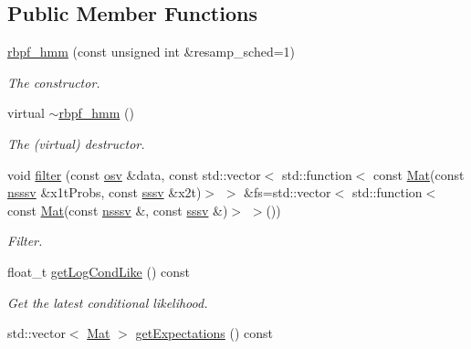 \subsection*{Public Member Functions}
\begin{DoxyCompactItemize}
\item 
\hyperlink{classrbpf__hmm_a39295fbe6066714572219c4544ba2940}{rbpf\+\_\+hmm} (const unsigned int \&resamp\+\_\+sched=1)
\begin{DoxyCompactList}\small\item\em The constructor. \end{DoxyCompactList}\item 
\mbox{\label{classrbpf__hmm_a9f463acdb7798d3bc86bc7d5abb31263}} 
virtual \hyperlink{classrbpf__hmm_a9f463acdb7798d3bc86bc7d5abb31263}{$\sim$rbpf\+\_\+hmm} ()
\begin{DoxyCompactList}\small\item\em The (virtual) destructor. \end{DoxyCompactList}\item 
void \hyperlink{classrbpf__hmm_a74864b32274b746d281295c293a28cdd}{filter} (const \hyperlink{classrbpf__hmm_adafd37687fdd3bb776d3d33a5b0e7080}{osv} \&data, const std\+::vector$<$ std\+::function$<$ const \hyperlink{classrbpf__hmm_ac32aaf9833767d6886f732243a77aa66}{Mat}(const \hyperlink{classrbpf__hmm_a7988465662f94f2ba45fd22566828d0f}{nsssv} \&x1t\+Probs, const \hyperlink{classrbpf__hmm_a28e8ad1d93bcf53cb74603f74826a81c}{sssv} \&x2t)$>$ $>$ \&fs=std\+::vector$<$ std\+::function$<$ const \hyperlink{classrbpf__hmm_ac32aaf9833767d6886f732243a77aa66}{Mat}(const \hyperlink{classrbpf__hmm_a7988465662f94f2ba45fd22566828d0f}{nsssv} \&, const \hyperlink{classrbpf__hmm_a28e8ad1d93bcf53cb74603f74826a81c}{sssv} \&)$>$ $>$())
\begin{DoxyCompactList}\small\item\em Filter. \end{DoxyCompactList}\item 
float\+\_\+t \hyperlink{classrbpf__hmm_ae0f486583c4c07f9bc97dd6288119889}{get\+Log\+Cond\+Like} () const
\begin{DoxyCompactList}\small\item\em Get the latest conditional likelihood. \end{DoxyCompactList}\item 
std\+::vector$<$ \hyperlink{classrbpf__hmm_ac32aaf9833767d6886f732243a77aa66}{Mat} $>$ \hyperlink{classrbpf__hmm_a98b2d1e39e0a092a000866d1cda7e701}{get\+Expectations} () const

\end{DoxyCompactItemize}
